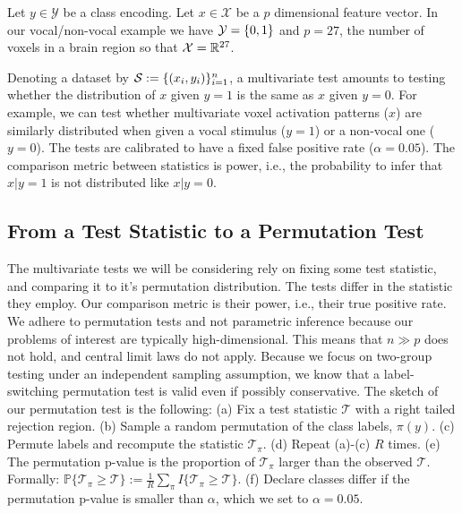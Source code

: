 \documentclass[journal]{IEEEtran}
\begin{document}
Let $y \in \mathcal{Y}$ be a class encoding. 
Let $x \in \mathcal{X}$ be a $p$ dimensional feature vector. 
In our vocal/non-vocal example we have $\mathcal{Y}=\{ 0,1 \}$ and $p=27$, the number of voxels in a brain region so that $\mathcal{X}=\mathbb{R}^{27}$. 

Denoting a dataset by $\mathcal{S}:=\{(x_i,y_i)\}_{i=1}^n$, a multivariate test amounts to testing whether the distribution of $x$ given $y=1$ is the same as $x$ given $y=0$. 
For example, we can test whether multivariate voxel activation patterns ($x$) are similarly distributed when given a vocal stimulus ($y=1$) or a non-vocal one ($y=0$).
The tests are calibrated to have a fixed false positive rate ($\alpha=0.05$).
The comparison metric between statistics is power, i.e., the probability to infer that $x|y=1$ is not distributed like $x|y=0$.


\subsection{From a Test Statistic to a Permutation Test}

The multivariate tests we will be considering rely on fixing some test statistic, and comparing it to it's permutation distribution. 
The tests differ in the statistic they employ.
Our comparison metric is their power, i.e., their true positive rate. 
We adhere to permutation tests and not parametric inference because our problems of interest are typically high-dimensional. 
This means that $n \gg p$ does not hold, and central limit laws do not apply.
Because we focus on two-group testing under an independent sampling assumption, we know that a label-switching permutation test is valid even if possibly conservative. 
The sketch of our permutation test is the following: \newline
(a) Fix a test statistic $\mathcal{T}$ with a right tailed rejection region. \newline
(b) Sample a random permutation of the class labels, $\pi(y)$. \newline
(c) Permute labels and recompute the statistic $\mathcal{T}_\pi$. \newline
(d) Repeat (a)-(c) $R$ times. \newline
(e) The permutation p-value is the proportion of  $\mathcal{T}_\pi$ larger than the observed $\mathcal{T}$. Formally: 
$\mathbb{P}\{\mathcal{T}_\pi \geq \mathcal{T}\}:=\frac{1}{R} \sum_{\pi} I\{\mathcal{T}_\pi \geq \mathcal{T}\}$.\newline
(f) Declare classes differ if the permutation p-value is smaller than $\alpha$, which we set to $\alpha=0.05$.
\bigskip
\end{document}
